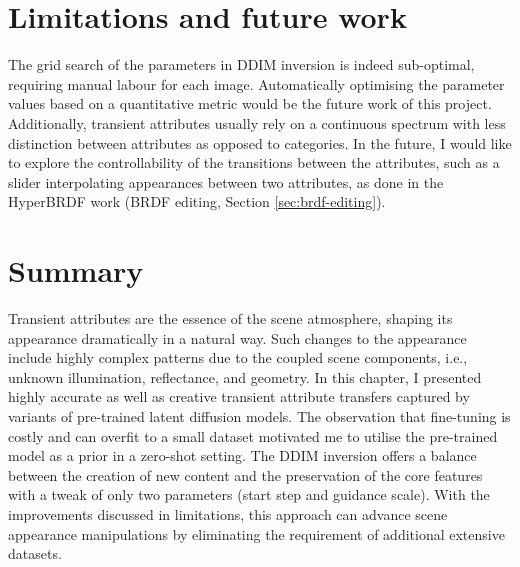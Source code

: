 









\section{Limitations and future work}
The grid search of the parameters in DDIM inversion is indeed sub-optimal, requiring manual labour for each image. Automatically optimising the parameter values based on a quantitative metric would be the future work of this project. Additionally, transient attributes usually rely on a continuous spectrum with less distinction between attributes as opposed to categories. In the future, I would like to explore the controllability of the transitions between the attributes, such as a slider interpolating appearances between two attributes, as done in the HyperBRDF work (BRDF editing, Section \ref{sec:brdf-editing}).

\section{Summary}

Transient attributes are the essence of the scene atmosphere, shaping its appearance dramatically in a natural way. Such changes to the appearance include highly complex patterns due to the coupled scene components, i.e., unknown illumination, reflectance, and geometry. In this chapter, I presented highly accurate as well as creative transient attribute transfers captured by variants of pre-trained latent diffusion models. The observation that fine-tuning is costly and can overfit to a small dataset motivated me to utilise the pre-trained model as a prior in a zero-shot setting. The DDIM inversion offers a balance between the creation of new content and the preservation of the core features with a tweak of only two parameters (start step and guidance scale). With the improvements discussed  in limitations, this approach can advance scene appearance manipulations by eliminating the requirement of additional extensive datasets. 


